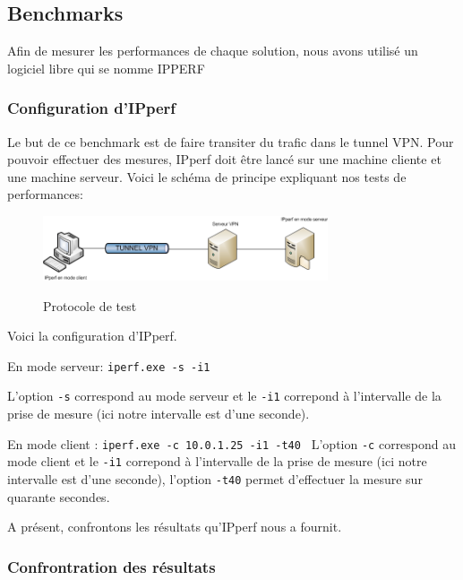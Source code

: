 \subsection{Benchmarks}

Afin de mesurer les performances de chaque solution, nous avons utilisé un logiciel libre qui se nomme IPPERF

\subsubsection{Configuration d'IPperf}

Le but de ce benchmark est de faire transiter du trafic dans le tunnel VPN. Pour pouvoir effectuer des mesures, IPperf doit être lancé sur une machine cliente et une machine serveur.
Voici le schéma de principe expliquant nos tests de performances:

\begin{figure}[H]
	\begin{center}
		\includegraphics[width=0.75\textwidth]{partie_3/images/ipperf.png}\\
	\end{center}
	\caption{Protocole de test}
	\label{Protocole_de_test}
\end{figure}

Voici la configuration d'IPperf.

En mode serveur:
\verb|iperf.exe -s -i1|

L'option \verb|-s| correspond au mode serveur et le \verb|-i1| correpond à l'intervalle de la prise de mesure (ici notre intervalle est d'une seconde).

En mode client : 
\verb|iperf.exe -c 10.0.1.25 -i1 -t40 |
L'option \verb|-c| correspond au mode client et le \verb|-i1| correpond à l'intervalle de la prise de mesure (ici notre intervalle est d'une seconde), l'option \verb|-t40| permet d'effectuer la mesure sur quarante secondes.

A présent, confrontons les résultats qu'IPperf nous a fournit.

\subsubsection{Confrontration des résultats}

